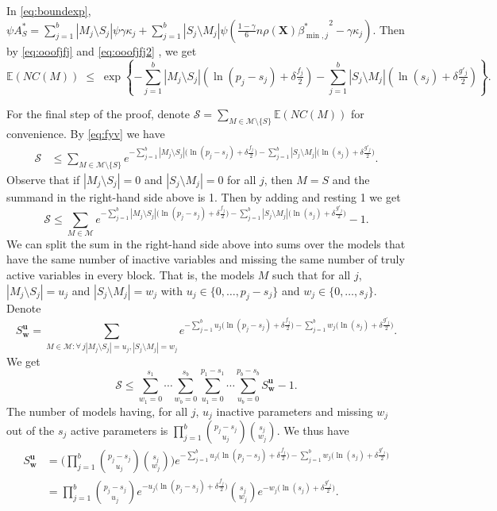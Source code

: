 \documentclass[bj,authoryear]{imsart}
\theoremstyle{plain}
\newcommand{\E}{\mathbb{E}}
\newcommand{\M}{\mathcal{M}}
\newcommand{\bs}{\boldsymbol}
\begin{document}
In \eqref{eq:boundexp}, $\psi A^*_S=\sum_{j=1}^b|M_j \setminus S_j|\psi\gamma\kappa_j + \sum_{j=1}^b |S_j\setminus M_j |\psi\left(\tfrac{1-\gamma}{6} n \rho(\bs X) {\beta^*_{\min,j}}^{2} - \gamma\kappa_j\right)$. Then by \eqref{eq:ooofjfj} and \eqref{eq:ooofjfj2} , we get
\begin{equation}\label{eq:fyv}
\E(NC(M))\;\leq\;\exp\left\{- \sum_{j=1}^b |M_j\setminus S_j|(\ln(p_j-s_j)+\delta \tfrac{f_j}{2})-\sum_{j=1}^b |S_j\setminus M_j|(\ln(s_j)+\delta \tfrac{g'_j}{2})\right\}.    
\end{equation}

For the final step of the proof, denote $\mathcal{S}= \sum_{M \in \M\setminus \{S\}} \E\left(NC(M)\right)$ for convenience. By \eqref{eq:fyv} we have
\begin{align*}
    \mathcal{S} &\leq \sum_{M \in \M\setminus \{S\}}e^{- \sum_{j=1}^b |M_j\setminus S_j|\big(\ln(p_j-s_j)+\delta \tfrac{f_j}{2}\big)-\sum_{j=1}^b |S_j\setminus M_j|\big(\ln(s_j)+\delta \tfrac{g'_j}{2}\big)}.
\end{align*}
Observe that if $|M_j\setminus S_j|=0$ and $|S_j\setminus M_j|=0$ for all $j$, then $M=S$ and the summand in the right-hand side above is 1. Then by adding and resting 1 we get
$$\mathcal{S} \leq \sum_{M \in \M}e^{- \sum_{j=1}^b |M_j\setminus S_j|\big(\ln(p_j-s_j)+\delta \tfrac{f_j}{2}\big)-\sum_{j=1}^b |S_j\setminus M_j|\big(\ln(s_j)+\delta \tfrac{g'_j}{2}\big)}-1.$$
We can split the sum in the right-hand side above into sums over the models that have the same number of inactive variables and missing the same number of truly active variables in every block. That is, the models $M$ such that for all $j$, $|M_j\setminus S_j|=u_j$ and $|S_j\setminus M_j|=w_j$ with $u_j \in \{0,\ldots,p_j-s_j\}$ and $w_j \in \{0,\ldots,s_j\}$. Denote
$$S^{\bs u}_{\bs w}=\sum_{M \in \M:\forall \,j |M_j\setminus S_j|=u_j, |S_j\setminus M_j|=w_j } e^{- \sum_{j=1}^b u_j\big(\ln(p_j-s_j)+\delta \tfrac{f_j}{2}\big)-\sum_{j=1}^b w_j\big(\ln(s_j)+\delta \tfrac{g'_j}{2}\big)}.$$
We get
\begin{equation}\label{eq:uygfew}
    \mathcal{S} \leq \sum_{w_1=0}^{s_1}\cdots\sum_{w_b=0}^{s_b}\sum_{u_1=0}^{p_1-s_1}\cdots\sum_{u_b=0}^{p_b-s_b}S^{\bs u}_{\bs w}-1.
\end{equation}
The number of models having, for all $j$, $u_j$ inactive parameters and missing $w_j$ out of the $s_j$ active parameters %
is $\prod_{j=1}^b {\binom{p_j-s_j}{u_j}}{\binom{s_j}{w_j}}$. We thus have
\begin{align*}
    S^{\bs u}_{\bs w}&= \bigg(\prod_{j=1}^b {\binom{p_j-s_j}{u_j}}{\binom{s_j}{w_j}}\bigg)e^{- \sum_{j=1}^b u_j\big(\ln(p_j-s_j)+\delta \tfrac{f_j}{2}\big)-\sum_{j=1}^b w_j\big(\ln(s_j)+\delta \tfrac{g'_j}{2}\big)} \\
    &= \prod_{j=1}^b {\binom{p_j-s_j}{u_j}}e^{- u_j\big(\ln(p_j-s_j)+\delta \tfrac{f_j}{2}\big)}{\binom{s_j}{w_j}}e^{-w_j\big(\ln(s_j)+\delta \tfrac{g'_j}{2}\big)}.
\end{align*}
\end{document}
